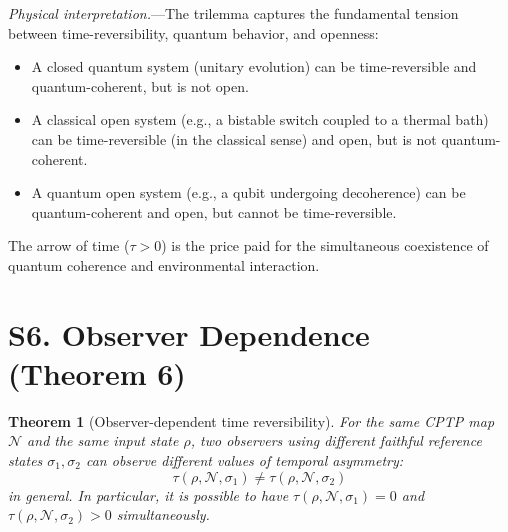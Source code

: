 \documentclass[prl,twocolumn,superscriptaddress,longbibliography]{revtex4-2}
\newtheorem{theorem}{Theorem}
\newcommand{\chan}{\mathcal{N}}
\newcommand{\tauasym}{\tau}
\begin{document}
\emph{Physical interpretation.}---The trilemma captures the
fundamental tension between time-reversibility, quantum behavior,
and openness:
\begin{itemize}
\item A closed quantum system (unitary evolution) can be
  time-reversible and quantum-coherent, but is not open.
\item A classical open system (e.g., a bistable switch coupled to a
  thermal bath) can be time-reversible (in the classical sense)
  and open, but is not quantum-coherent.
\item A quantum open system (e.g., a qubit undergoing decoherence)
  can be quantum-coherent and open, but cannot be time-reversible.
\end{itemize}
The arrow of time ($\tauasym > 0$) is the price paid for the
simultaneous coexistence of quantum coherence and environmental
interaction.

\section{S6. Observer Dependence (Theorem 6)}
\label{sec:thm6}

\begin{theorem}[Observer-dependent time reversibility]
\label{thm:observer}
For the same CPTP map $\chan$ and the same input state $\rho$,
two observers using different faithful reference states
$\sigma_1, \sigma_2$ can observe different values of temporal
asymmetry:
\begin{equation}
\tauasym(\rho, \chan, \sigma_1) \neq
\tauasym(\rho, \chan, \sigma_2)
\end{equation}
in general.  In particular, it is possible to have
$\tauasym(\rho, \chan, \sigma_1) = 0$ and
$\tauasym(\rho, \chan, \sigma_2) > 0$ simultaneously.
\end{theorem}
\end{document}
